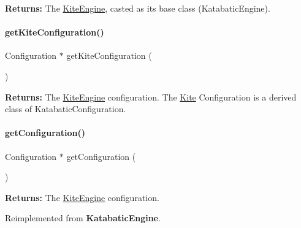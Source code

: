 {\bfseries Returns\+:} The \hyperlink{classKite_1_1KiteEngine}{Kite\+Engine}, casted as it\textquotesingle{}s base class (Katabatic\+Engine). \mbox{\label{classKite_1_1KiteEngine_a1af1f95e771fba5c85a19ea2d686553a}} 
\paragraph{\texorpdfstring{get\+Kite\+Configuration()}{getKiteConfiguration()}}
{\footnotesize\ttfamily Configuration $\ast$ get\+Kite\+Configuration (\begin{DoxyParamCaption}{ }\end{DoxyParamCaption})\hspace{0.3cm}{\ttfamily [inline]}}

{\bfseries Returns\+:} The \hyperlink{classKite_1_1KiteEngine}{Kite\+Engine} configuration. The \hyperlink{namespaceKite}{Kite} Configuration is a derived class of Katabatic\+Configuration. \mbox{\label{classKite_1_1KiteEngine_a9a7fbadfe526875680f698c76adfb128}} 
\paragraph{\texorpdfstring{get\+Configuration()}{getConfiguration()}}
{\footnotesize\ttfamily Configuration $\ast$ get\+Configuration (\begin{DoxyParamCaption}{ }\end{DoxyParamCaption})\hspace{0.3cm}{\ttfamily [virtual]}}

{\bfseries Returns\+:} The \hyperlink{classKite_1_1KiteEngine}{Kite\+Engine} configuration. 

Reimplemented from \textbf{ Katabatic\+Engine}.

\mbox{\label{classKite_1_1KiteEngine_aef6f41b0e8265ad574d1797f46ab9fa8}} 
